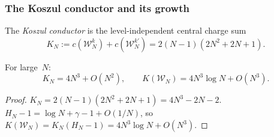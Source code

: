 \subsubsection{The Koszul conductor and its growth}

\begin{definition}
The \emph{Koszul conductor} is the level-independent central charge sum
\begin{equation}%
K_N := c(\mathcal{W}_N^k) + c(\mathcal{W}_N^{k'})
= 2(N-1)(2N^2 + 2N + 1).
\end{equation}
\end{definition}

\begin{proposition}
For large~$N$:
\begin{equation}%
K_N = 4N^3 + O(N^2),
\qquad
K(\mathcal{W}_N) = 4N^3 \log N + O(N^3).
\end{equation}
\end{proposition}

\begin{proof}
$K_N = 2(N-1)(2N^2+2N+1) = 4N^3 - 2N - 2$.
$H_N - 1 = \log N + \gamma - 1 + O(1/N)$, so
$K(\mathcal{W}_N) = K_N(H_N - 1) = 4N^3 \log N + O(N^3)$.
\end{proof}

